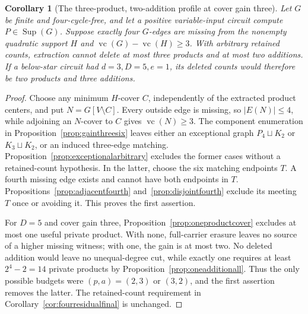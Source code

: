 \documentclass[11pt]{article}
\newcommand{\Sup}{\operatorname{Sup}}
\newcommand{\vc}{\operatorname{vc}}
\newtheorem{corollary}[theorem]{Corollary}
\theoremstyle{definition}
\theoremstyle{remark}
\begin{document}
\begin{corollary}[The three-product, two-addition profile at cover gain three]\label{cor:gainthreeprofile}
Let $G$ be finite and four-cycle-free, and let a positive variable-input circuit compute $P\in\Sup(G)$. Suppose exactly four $G$-edges are missing from the nonempty quadratic support $H$ and $\vc(G)-\vc(H)\geq3$. With arbitrary retained counts, extraction cannot delete at most three products and at most two additions. If a below-star circuit had $d=3,D=5,e=1$, its deleted counts would therefore be two products and three additions.
\end{corollary}
\begin{proof}
Choose any minimum $H$-cover $C$, independently of the extracted product centers, and put $N=G[V\setminus C]$. Every outside edge is missing, so $|E(N)|\leq4$, while adjoining an $N$-cover to $C$ gives $\vc(N)\geq3$. The component enumeration in Proposition~\ref{prop:gainthreesix} leaves either an exceptional graph $P_4\sqcup K_2$ or $K_3\sqcup K_2$, or an induced three-edge matching. Proposition~\ref{prop:exceptionalarbitrary} excludes the former cases without a retained-count hypothesis. In the latter, choose the six matching endpoints $T$. A fourth missing edge exists and cannot have both endpoints in $T$. Propositions~\ref{prop:adjacentfourth} and~\ref{prop:disjointfourth} exclude its meeting $T$ once or avoiding it. This proves the first assertion.

For $D=5$ and cover gain three, Proposition~\ref{prop:oneproductcover} excludes at most one useful private product. With none, full-carrier erasure leaves no source of a higher missing witness; with one, the gain is at most two. No deleted addition would leave no unequal-degree cut, while exactly one requires at least $2^4-2=14$ private products by Proposition~\ref{prop:oneadditionall}. Thus the only possible budgets were $(p,a)=(2,3)$ or $(3,2)$, and the first assertion removes the latter. The retained-count requirement in Corollary~\ref{cor:fourresidualfinal} is unchanged.
\end{proof}
\end{document}
